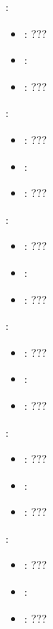 \begin{itemize}
{    \item {}:
           \begin{itemize}
                \item \optionPossibleValues{}: ???
                \item \optionDefaultValue{}: 
                \item \optionDescrption{}: ???
           \end{itemize}
    \item {}:
           \begin{itemize}
                \item \optionPossibleValues{}: ???
                \item \optionDefaultValue{}: 
                \item \optionDescrption{}: ???
           \end{itemize}
    \item {}:
           \begin{itemize}
                \item \optionPossibleValues{}: ???
                \item \optionDefaultValue{}: 
                \item \optionDescrption{}: ???
           \end{itemize}
    \item {}:
           \begin{itemize}
                \item \optionPossibleValues{}: ???
                \item \optionDefaultValue{}: 
                \item \optionDescrption{}: ???
           \end{itemize}
    \item {}:
           \begin{itemize}
                \item \optionPossibleValues{}: ???
                \item \optionDefaultValue{}: 
                \item \optionDescrption{}: ???
           \end{itemize}
    \item {}:
           \begin{itemize}
                \item \optionPossibleValues{}: ???
                \item \optionDefaultValue{}: 
                \item \optionDescrption{}: ???
           \end{itemize}
    }
\end{itemize}
